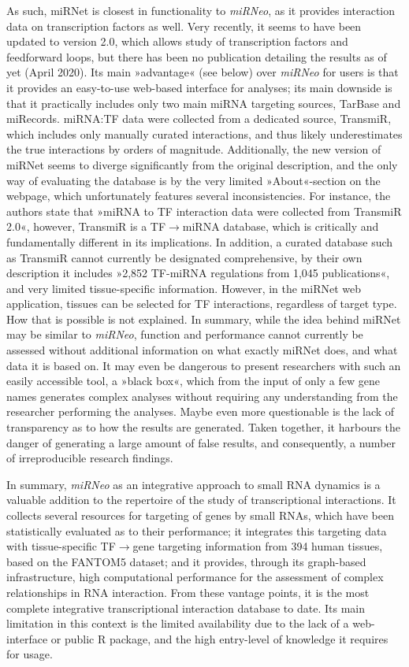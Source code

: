 As such, miRNet\cite{Fan2016} is closest in functionality to \emph{miRNeo}, as it provides interaction data on transcription factors as well. Very recently, it seems to have been updated to version 2.0, which allows study of transcription factors and feedforward loops, but there has been no publication detailing the results as of yet (April 2020). Its main »advantage« (see below) over \emph{miRNeo} for users is that it provides an easy-to-use web-based interface for analyses; its main downside is that it practically includes only two main miRNA targeting sources, TarBase and miRecords. miRNA:TF data were collected from a dedicated source, TransmiR, which includes only manually curated interactions, and thus likely underestimates the true interactions by orders of magnitude. Additionally, the new version of miRNet seems to diverge significantly from the original description,\cite{Fan2016} and the only way of evaluating the database is by the very limited »About«-section on the webpage, which unfortunately features several inconsistencies. For instance, the authors state that »miRNA to TF interaction data were collected from TransmiR 2.0«, however, TransmiR is a TF$\to$miRNA database, which is critically and fundamentally different in its implications. In addition, a curated database such as TransmiR cannot currently be designated comprehensive, by their own description it includes »2,852 TF-miRNA regulations from 1,045 publications«, and very limited tissue-specific information. However, in the miRNet web application, tissues can be selected for TF interactions, regardless of target type. How that is possible is not explained. In summary, while the idea behind miRNet may be similar to \emph{miRNeo}, function and performance cannot currently be assessed without additional information on what exactly miRNet does, and what data it is based on. It may even be dangerous to present researchers with such an easily accessible tool, a »black box«, which from the input of only a few gene names generates complex analyses without requiring any understanding from the researcher performing the analyses. Maybe even more questionable is the lack of transparency as to how the results are generated. Taken together, it harbours the danger of generating a large amount of false results, and consequently, a number of irreproducible research findings.

In summary, \emph{miRNeo} as an integrative approach to small RNA dynamics is a valuable addition to the repertoire of the study of transcriptional interactions. It collects several resources for targeting of genes by small RNAs, which have been statistically evaluated as to their performance; it integrates this targeting data with tissue-specific TF$\to$gene targeting information from 394 human tissues, based on the \mbox{FANTOM5} dataset; and it provides, through its graph-based infrastructure, high computational performance for the assessment of complex relationships in RNA interaction. From these vantage points, it is the most complete integrative transcriptional interaction database to date. Its main limitation in this context is the limited availability due to the lack of a web-interface or public R package, and the high entry-level of knowledge it requires for usage.

